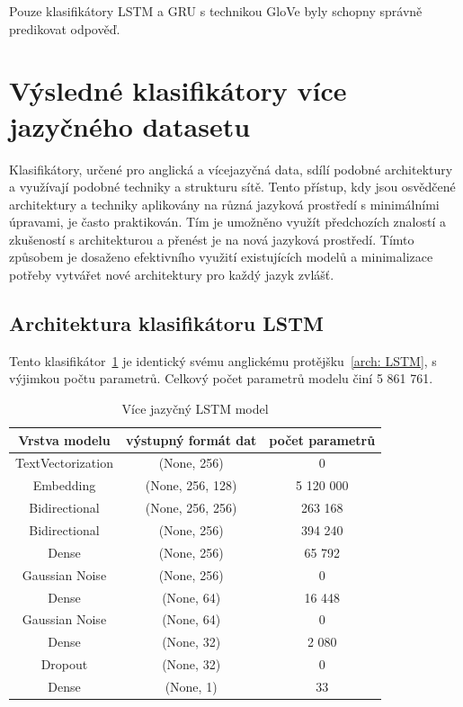 Pouze klasifikátory LSTM a GRU s technikou GloVe byly schopny správně predikovat odpověď.

\section{Výsledné klasifikátory více jazyčného datasetu}
Klasifikátory, určené pro anglická a vícejazyčná data, sdílí podobné architektury a využívají podobné techniky a strukturu sítě.
Tento přístup, kdy jsou osvědčené architektury a techniky aplikovány na různá jazyková prostředí s minimálními úpravami, je často praktikován.
Tím je umožněno využít předchozích znalostí a zkušeností s architekturou a přenést je na nová jazyková prostředí.
Tímto způsobem je dosaženo efektivního využití existujících modelů a minimalizace potřeby vytvářet nové architektury pro každý jazyk zvlášť.

\subsection{Architektura klasifikátoru LSTM}
Tento klasifikátor~\ref{tab:MULTI LSTM model} je identický svému anglickému protějšku~\ref{arch: LSTM}, s výjimkou počtu parametrů.
Celkový počet parametrů modelu činí 5 861 761.

\begin{table}[H]
	\centering
	\caption{Více jazyčný LSTM model}\label{tab:MULTI LSTM model}
	\begin{tabular}{ c c c }
			\toprule
			Vrstva modelu & výstupný formát dat & počet parametrů\\
			\midrule
            TextVectorization & (None, 256) & 0\\         
            Embedding & (None, 256, 128) & 5 120 000\\   
            Bidirectional & (None, 256, 256) & 263 168\\    
            Bidirectional & (None, 256) & 394 240\\
			Dense & (None, 256) & 65 792\\ 
			Gaussian Noise & (None, 256) & 0\\
            Dense & (None, 64) & 16 448\\ 
			Gaussian Noise & (None, 64) & 0\\
			Dense & (None, 32) & 2 080\\ 
            Dropout & (None, 32) & 0\\   
            Dense & (None, 1) & 33\\ 
			\midrule
		\end{tabular}
\end{table}

